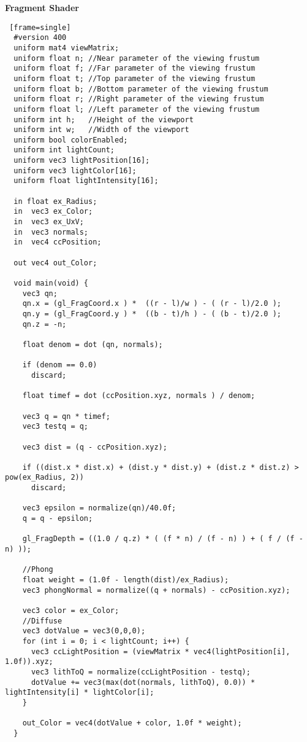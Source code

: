 \textbf{Fragment Shader}
\begin{lstlisting} [frame=single]
  #version 400
  uniform mat4 viewMatrix;
  uniform float n; //Near parameter of the viewing frustum
  uniform float f; //Far parameter of the viewing frustum
  uniform float t; //Top parameter of the viewing frustum
  uniform float b; //Bottom parameter of the viewing frustum
  uniform float r; //Right parameter of the viewing frustum
  uniform float l; //Left parameter of the viewing frustum
  uniform int h;   //Height of the viewport
  uniform int w;   //Width of the viewport
  uniform bool colorEnabled;
  uniform int lightCount;
  uniform vec3 lightPosition[16];
  uniform vec3 lightColor[16];
  uniform float lightIntensity[16];

  in float ex_Radius;
  in  vec3 ex_Color;
  in  vec3 ex_UxV;
  in  vec3 normals;
  in  vec4 ccPosition;

  out vec4 out_Color;

  void main(void) {
    vec3 qn;
    qn.x = (gl_FragCoord.x ) *  ((r - l)/w ) - ( (r - l)/2.0 );
    qn.y = (gl_FragCoord.y ) *  ((b - t)/h ) - ( (b - t)/2.0 );
    qn.z = -n;

    float denom = dot (qn, normals);

    if (denom == 0.0)
      discard;

    float timef = dot (ccPosition.xyz, normals ) / denom;

    vec3 q = qn * timef;
    vec3 testq = q;

    vec3 dist = (q - ccPosition.xyz);

    if ((dist.x * dist.x) + (dist.y * dist.y) + (dist.z * dist.z) > pow(ex_Radius, 2))
      discard;

    vec3 epsilon = normalize(qn)/40.0f;
    q = q - epsilon;

    gl_FragDepth = ((1.0 / q.z) * ( (f * n) / (f - n) ) + ( f / (f - n) ));

    //Phong
    float weight = (1.0f - length(dist)/ex_Radius);
    vec3 phongNormal = normalize((q + normals) - ccPosition.xyz);

    vec3 color = ex_Color;
    //Diffuse
    vec3 dotValue = vec3(0,0,0);
    for (int i = 0; i < lightCount; i++) {
      vec3 ccLightPosition = (viewMatrix * vec4(lightPosition[i], 1.0f)).xyz;
      vec3 lithToQ = normalize(ccLightPosition - testq);
      dotValue += vec3(max(dot(normals, lithToQ), 0.0)) * lightIntensity[i] * lightColor[i];
    }

    out_Color = vec4(dotValue + color, 1.0f * weight);
  }
\end{lstlisting}
\newpage

